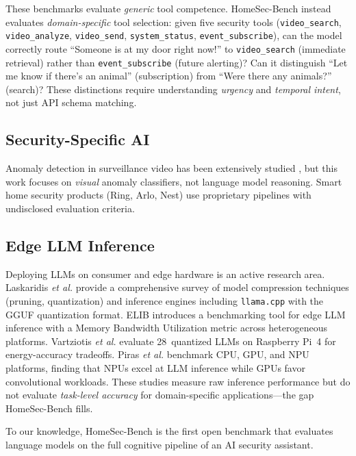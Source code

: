 \documentclass[conference]{IEEEtran}
\begin{document}
These benchmarks evaluate \emph{generic} tool competence. HomeSec-Bench
instead evaluates \emph{domain-specific} tool selection: given five
security tools (\texttt{video\_search}, \texttt{video\_analyze},
\texttt{video\_send}, \texttt{system\_status}, \texttt{event\_subscribe}),
can the model correctly route ``Someone is at my door right now!'' to
\texttt{video\_search} (immediate retrieval) rather than
\texttt{event\_subscribe} (future alerting)? Can it distinguish ``Let me
know if there's an animal'' (subscription) from ``Were there any
animals?'' (search)? These distinctions require understanding
\emph{urgency} and \emph{temporal intent}, not just API schema matching.

\subsection{Security-Specific AI}
Anomaly detection in surveillance video has been extensively studied
\cite{sultani2018realworld}, but this work focuses on \emph{visual}
anomaly classifiers, not language model reasoning. Smart home security
products (Ring, Arlo, Nest) use proprietary pipelines with undisclosed
evaluation criteria.

\subsection{Edge LLM Inference}
Deploying LLMs on consumer and edge hardware is an active research area.
Laskaridis \textit{et al.} \cite{laskaridis2024llmedge} provide a
comprehensive survey of model compression techniques (pruning,
quantization) and inference engines including \texttt{llama.cpp} with
the GGUF quantization format. ELIB \cite{lai2025elib} introduces
a benchmarking tool for edge LLM inference with a Memory Bandwidth
Utilization metric across heterogeneous platforms. Vartziotis
\textit{et al.} \cite{vartziotis2025sustainable} evaluate 28~quantized
LLMs on Raspberry Pi~4 for energy-accuracy tradeoffs. Piras
\textit{et al.} \cite{piras2024npubench} benchmark CPU, GPU, and NPU
platforms, finding that NPUs excel at LLM inference while GPUs favor
convolutional workloads. These studies measure raw inference
performance but do not evaluate \emph{task-level accuracy}
for domain-specific applications---the gap HomeSec-Bench fills.

To our knowledge, HomeSec-Bench is the first
open benchmark that evaluates language models on the full cognitive
pipeline of an AI security assistant.
\end{document}
